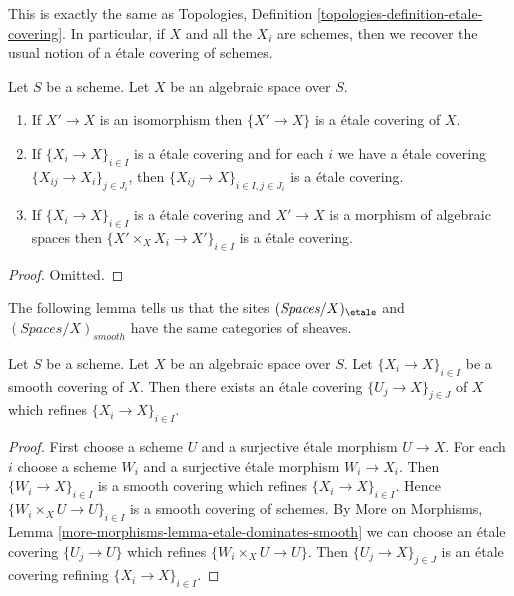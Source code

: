\noindent
This is exactly the same as
Topologies, Definition \ref{topologies-definition-etale-covering}.
In particular, if $X$ and all the $X_i$ are schemes, then we recover the
usual notion of a \'etale covering of schemes.

\begin{lemma}
\label{lemma-etale}
Let $S$ be a scheme.
Let $X$ be an algebraic space over $S$.
\begin{enumerate}
\item If $X' \to X$ is an isomorphism then $\{X' \to X\}$
is a \'etale covering of $X$.
\item If $\{X_i \to X\}_{i\in I}$ is a \'etale covering and for each
$i$ we have a \'etale covering $\{X_{ij} \to X_i\}_{j\in J_i}$, then
$\{X_{ij} \to X\}_{i \in I, j\in J_i}$ is a \'etale covering.
\item If $\{X_i \to X\}_{i\in I}$ is a \'etale covering
and $X' \to X$ is a morphism of algebraic spaces then
$\{X' \times_X X_i \to X'\}_{i\in I}$ is a \'etale covering.
\end{enumerate}
\end{lemma}

\begin{proof}
Omitted.
\end{proof}

\noindent
The following lemma tells us that the sites
$(\textit{Spaces}/X)_\etale$ and $(\textit{Spaces}/X)_{smooth}$
have the same categories of sheaves.

\begin{lemma}
\label{lemma-etale-dominates-smooth}
Let $S$ be a scheme. Let $X$ be an algebraic space over $S$.
Let $\{X_i \to X\}_{i \in I}$ be a smooth covering of $X$.
Then there exists an \'etale covering $\{U_j \to X\}_{j \in J}$
of $X$ which refines $\{X_i \to X\}_{i \in I}$.
\end{lemma}

\begin{proof}
First choose a scheme $U$ and a surjective \'etale morphism $U \to X$.
For each $i$ choose a scheme $W_i$ and a surjective \'etale morphism
$W_i \to X_i$. Then $\{W_i \to X\}_{i \in I}$ is a smooth covering
which refines $\{X_i \to X\}_{i \in I}$. Hence
$\{W_i \times_X U \to U\}_{i \in I}$ is a smooth covering of schemes.
By More on Morphisms, Lemma \ref{more-morphisms-lemma-etale-dominates-smooth}
we can choose an \'etale covering $\{U_j \to U\}$ which refines
$\{W_i \times_X U \to U\}$. Then $\{U_j \to X\}_{j \in J}$
is an \'etale covering refining $\{X_i \to X\}_{i \in I}$.
\end{proof}

